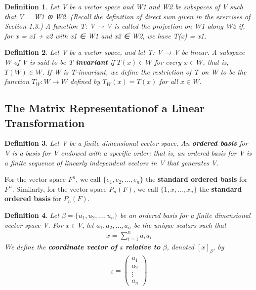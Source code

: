 \documentclass{article}
\newcommand{\bd}[1]{\textbf{#1}}
\theoremstyle{plain}
\newtheorem*{definition1}{Definition}
\theoremstyle{plain} %
\begin{document}
\begin{definition1}
Let V be a vector space and W1 and W2 be subspaces of
V such that V = W1 ⊕ W2. (Recall the definition of direct sum given in the
exercises of Section 1.3.) A function T: V → V is called the projection on
W1 along W2 if, for x = x1 + x2 with x1 ∈ W1 and x2 ∈ W2, we have
T(x) = x1.
\end{definition1}

\begin{definition1}
Let V be a vector space, and let T: V → V be linear. A subspace W of V is said to be T-\bd{invariant} if $T(x) \in W$ for every $x \in W$, that is, $T(W) \in W$. If W is T-invariant, we define the restriction of T on W to be the function $T_W : W \to W$ defined by $T_W(x) = T(x)$ for all $x \in W$.
\end{definition1}

\subsection{The Matrix  Representationof a Linear Transformation}

\begin{definition1}
Let V be a finite-dimensional vector space. An \bd{ordered basis} for V is a basis for V endowed with a specific order; that is, an ordered basis for V is a finite sequence of linearly independent vectors in V that generates V.
\end{definition1}

For the vector space $F^n$, we call $\{e_1, e_2,\ldots,e_n\}$ the \bd{standard ordered basis} for $F^n$. Similarly, for the vector space $P_n(F)$, we call $\{1, x, \ldots , x_n\}$ the \bd{standard ordered basis} for $P_n(F)$.

\begin{definition1}
Let $β = \{u_1, u_2,\ldots,u_n\}$ be an ordered basis for a finite dimensional vector space V. For $x \in V$, let $a_1, a_2,\ldots,a_n$ be the unique scalars such that
\begin{align*}
x=\sum_{i=1}^n a_iu_i
\end{align*}
We define the \bd{coordinate vector of} x \bd{relative to} $\beta$, denoted $[x]_\beta$, by
\begin{align*}
[x]_\beta = \begin{pmatrix}a_1\\a_2\\\vdots\\a_n\end{pmatrix}
\end{align*}
\end{definition1}
\end{document}
